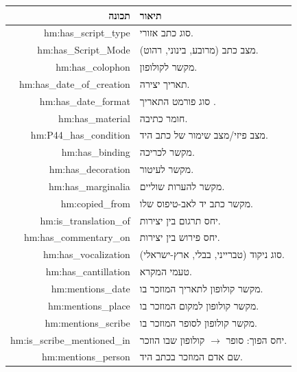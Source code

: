 \documentclass[12pt,a4paper]{article}
\newcommand{\en}[1]{\textenglish{\LR{#1}}}
\newcommand{\new}[1]{\textcolor{newaddition}{#1}}
\begin{document}
\begin{longtable}{|r|p{8cm}|}
\hline
\textbf{תכונה} & \textbf{תיאור} \\
\hline
\endhead

hm:has\_script\_type & סוג כתב אזורי.\\
\hline
hm:has\_Script\_Mode & מצב כתב (מרובע, בינוני, רהוט).\\
\hline
hm:has\_colophon & מקשר לקולופון.\\
\hline
hm:has\_date\_of\_creation & תאריך יצירה.\\
\hline
\new{hm:has\_date\_format} & \new{סוג פורמט התאריך \en{(GregorianYear, HebrewYear, FullDate, UnstructuredDate)}.}\\
\hline
hm:has\_material & חומר כתיבה.\\
\hline
hm:P44\_has\_condition & מצב פיזי/מצב שימור של כתב היד.\\
\hline
hm:has\_binding & מקשר לכריכה.\\
\hline
hm:has\_decoration & מקשר לעיטור.\\
\hline
hm:has\_marginalia & מקשר להערות שוליים.\\
\hline
hm:copied\_from & מקשר כתב יד לאב-טיפוס שלו.\\
\hline
hm:is\_translation\_of & יחס תרגום בין יצירות.\\
\hline
hm:has\_commentary\_on & יחס פירוש בין יצירות.\\
\hline

hm:has\_vocalization & סוג ניקוד (טברייני, בבלי, ארץ-ישראלי).\\
\hline

hm:has\_cantillation & טעמי המקרא.\\
\hline

hm:mentions\_date & מקשר קולופון לתאריך המוזכר בו.\\
\hline

hm:mentions\_place & מקשר קולופון למקום המוזכר בו.\\
\hline

hm:mentions\_scribe & מקשר קולופון לסופר המוזכר בו.\\
\hline

hm:is\_scribe\_mentioned\_in & יחס הפוך: סופר $\rightarrow$ קולופון שבו הוזכר.\\
\hline

hm:mentions\_person & שם אדם המוזכר בכתב היד.\\
\hline
\end{longtable}

\end{document}
